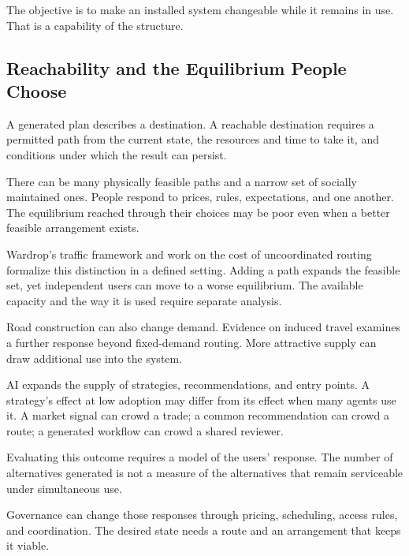 The objective is to make an installed system changeable while it remains in use. That is a capability of the structure.

\subsection{Reachability and the Equilibrium People Choose}


A generated plan describes a destination. A reachable destination requires a permitted path from the current state, the resources and time to take it, and conditions under which the result can persist.

There can be many physically feasible paths and a narrow set of socially maintained ones. People respond to prices, rules, expectations, and one another. The equilibrium reached through their choices may be poor even when a better feasible arrangement exists.

Wardrop's traffic framework and work on the cost of uncoordinated routing formalize this distinction in a defined setting.\cite{wardrop1952some,roughgarden2002how} Adding a path expands the feasible set, yet independent users can move to a worse equilibrium. The available capacity and the way it is used require separate analysis.

Road construction can also change demand. Evidence on induced travel examines a further response beyond fixed-demand routing.\cite{duranton2011fundamental} More attractive supply can draw additional use into the system.


AI expands the supply of strategies, recommendations, and entry points. A strategy's effect at low adoption may differ from its effect when many agents use it. A market signal can crowd a trade; a common recommendation can crowd a route; a generated workflow can crowd a shared reviewer.

Evaluating this outcome requires a model of the users' response. The number of alternatives generated is not a measure of the alternatives that remain serviceable under simultaneous use.

Governance can change those responses through pricing, scheduling, access rules, and coordination. The desired state needs a route and an arrangement that keeps it viable.


